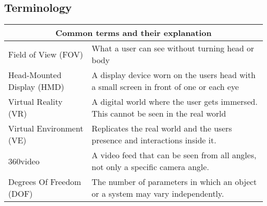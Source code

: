 \subsection{Terminology}
\begin{tabular}{ | p{5.5cm} | p{6.5cm} |  }
	\hline
     	\multicolumn{2}{|c|}{Common terms and their explanation} \\
     	\hline
	Field of View (FOV) & What a user can see without turning head or body \\
    	\hline
     	Head-Mounted Display (HMD) & A display device worn on the users head with a small screen in front of one or each eye \\
    	\hline
     	Virtual Reality (VR) & A digital world where the user gets immersed. This cannot be seen in the real world
			\\
    	\hline
	Virtual Environment (VE) & Replicates the real world and the users presence and interactions inside it.  \\
     	\hline
     	360\degree video & A video feed that can be seen from all angles, not only a specific camera angle. \\
     	\hline
Degrees Of Freedom (DOF) & The number of parameters in which an object or a system may vary independently. \\
\hline
\end{tabular}
